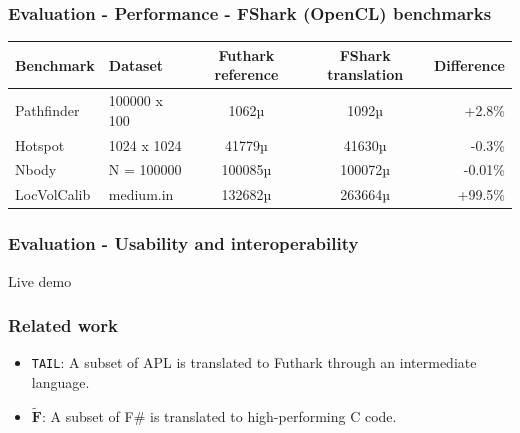 \documentclass[10pt, compress, usenames, dvipsnames]{beamer}
\begin{document}
\begin{frame}[fragile,c]
  \frametitle{Evaluation - Performance - FShark (OpenCL) benchmarks}
  \begin{center}
  {\scriptsize
  \begin{tabular}{| l | l | c | c | r |}
    \hline			
    \textbf{Benchmark} & \textbf{Dataset} & \textbf{Futhark reference} & \textbf{FShark translation} & \textbf{Difference} \\
    \hline  
    Pathfinder & 100000 x 100 & 1062µ & 1092µ & +2.8\% \\
    \hline  
    Hotspot & 1024 x 1024 & 41779µ & 41630µ & -0.3\% \\
    \hline  
    Nbody & N = 100000 & 100085µ & 100072µ & -0.01\% \\
    \hline  
    LocVolCalib & medium.in & 132682µ & 263664µ & +99.5\% \\
    \hline  
  \end{tabular}
  }
    \end{center}
\end{frame}

\begin{frame}[fragile]
  \frametitle{Evaluation - Usability and interoperability}
  \begin{center}
    \Huge Live demo
  \end{center}
  
\end{frame}

\begin{frame}[fragile]
  \frametitle{Related work}
  \begin{itemize}
  \item<1-> \texttt{TAIL}: A subset of APL is translated to Futhark through an
    intermediate language.
  \item<2-> $\widetilde{\mathbf{F}}$: A subset of F\# is translated to high-performing C code.
  \end{itemize}
\end{frame}

\end{document}
